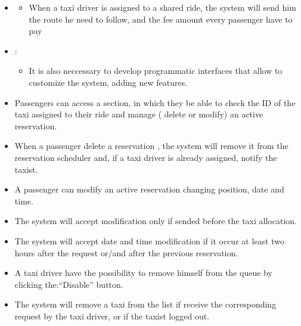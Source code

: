 \begin {itemize}
\begin{itemize}
	\end{itemize}
\item[G7]
	\begin{itemize}
	\item When a taxi driver is assigned to a shared ride, the system will send him the route he need to follow, and the fee amount every passenger have to pay
	\end{itemize}
\item[G8]:
	\begin{itemize}
	\item  It is also neccessary to develop programmatic interfaces that allow to customize the system, adding new features.
	\end{itemize}
\end {itemize}
\begin{itemize}
 \item Passengers can access a section, in which they be able to check the ID of the taxi assigned to their ride 
 and manage ( delete or modify) an active reservation.
 \item When a passenger delete a reservation , the system will remove it from the reservation scheduler and, if a taxi 
 driver is already assigned, notify the taxist.
 \item A passenger can modify an active reservation changing position, date and time.
 \item The system will accept modification only if sended before the taxi allocation.
 \item The system will accept date and time modification if it occur at least two hours after the request or/and after the 
 previous reservation.
 \item A taxi driver have the possibility to remove himself from the queue by clicking the:``Disable'' button.
 \item The system will remove a taxi from the list if receive the corresponding request by the taxi driver, or if the taxist logged out.
\end{itemize}

